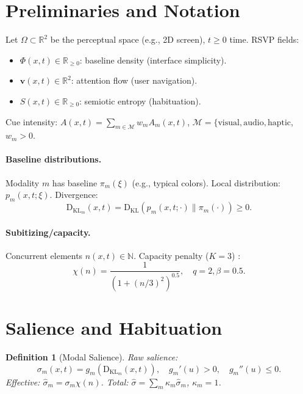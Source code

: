 \documentclass[openany]{book}
\newtheorem{definition}{Definition}[chapter]
\newcommand{\PhiS}{\Phi} %
\newcommand{\vvec}{\mathbf{v}} %
\newcommand{\Sent}{S} %
\newcommand{\KL}{\mathrm{D}_{\mathrm{KL}}}
\begin{document}
{{{{{{{{{{{{\section{Preliminaries and Notation}
\label{sec:rsvp-prelim}
Let \(\Omega \subset \mathbb{R}^2\) be the perceptual space (e.g., 2D screen), \(t \geq 0\) time. RSVP fields:
\begin{itemize}
  \item \(\PhiS(x,t) \in \mathbb{R}_{\geq 0}\): baseline density (interface simplicity).
  \item \(\vvec(x,t) \in \mathbb{R}^2\): attention flow (user navigation).
  \item \(\Sent(x,t) \in \mathbb{R}_{\geq 0}\): semiotic entropy (habituation).
\end{itemize}
Cue intensity: \(A(x,t) = \sum_{m \in \mathcal{M}} w_m A_m(x,t)\), \(\mathcal{M} = \{\text{visual}, \text{audio}, \text{haptic}\), \(w_m > 0\).

\paragraph{Baseline distributions.}
Modality \(m\) has baseline \(\pi_m(\xi)\) (e.g., typical colors). Local distribution: \(p_m(x,t;\xi)\). Divergence:
\begin{equation}
\label{eq:KL}
\KL_{m}(x,t) = \mathrm{D}_{\mathrm{KL}}(p_m(x,t;\cdot) \parallel \pi_m(\cdot)) \geq 0.
\end{equation}

\paragraph{Subitizing/capacity.}
Concurrent elements \(n(x,t) \in \mathbb{N}\). Capacity penalty (\(K = 3\)) \citep{kaufman1949}:
\begin{equation}
\label{eq:capacity}
\chi(n) = \frac{1}{(1 + (n/3)^2)^{0.5}}, \quad q = 2, \beta = 0.5.
\end{equation}

\section{Salience and Habituation}
\label{sec:rsvp-salience}
\begin{definition}[Modal Salience]
Raw salience:
\begin{equation}
\label{eq:raw-salience}
\sigma_{m}(x,t) = g_m(\KL_{m}(x,t)), \quad g_m'(u) > 0, \quad g_m''(u) \leq 0.
\end{equation}
Effective: \(\widehat{\sigma}_{m} = \sigma_{m} \chi(n)\). Total: \(\widehat{\sigma} = \sum_m \kappa_m \widehat{\sigma}_{m}\), \(\kappa_m = 1\).
\end{definition}

}}}}}}}}}}}}
\end{document}
